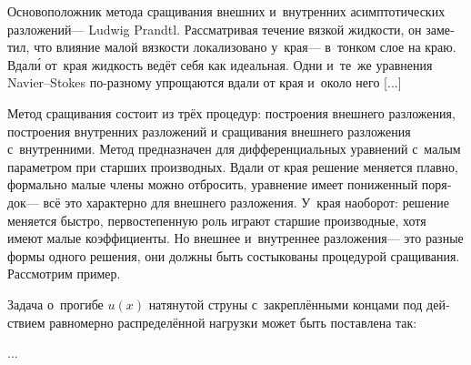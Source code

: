 

\begin{otherlanguage}{russian}

Основоположник метода сращивания внешних и~внутренних асимптотических разложений\:--- Ludwig Prandtl.
Рассматривая течение вязкой жидкости, он заметил, что влияние малой вязкости локализовано у~края\:--- в~тонком слое на краю.
Вдал\'{и} от~края жидкость ведёт себя как идеальная.
Одни и~те~же уравнения Navier--Stokes по-разному упрощаются вдали от края и~около него [...]

Метод сращивания состоит из трёх процедур: построения внешнего разложения, построения внутренних разложений и сращивания внешнего разложения с~внутренними.
Метод предназначен для дифференциальных уравнений с~малым параметром при старших производных.
Вдали от края решение меняется плавно, формально малые члены можно отбросить, уравнение имеет пониженный порядок\:--- всё это характерно для внешнего разложения.
У~края наоборот: решение меняется быстро,   первостепенную роль играют старшие производные, хотя имеют малые коэффициенты.
Но внешнее и~внутреннее разложения\:--- это разные формы одного решения, они должны быть состыкованы процедурой сращивания. Рассмотрим пример.

Задача о~прогибе $u(x)$ натянутой струны с~закреплёнными концами под действием равномерно распределённой нагрузки может быть поставлена так:

...

\end{otherlanguage}




